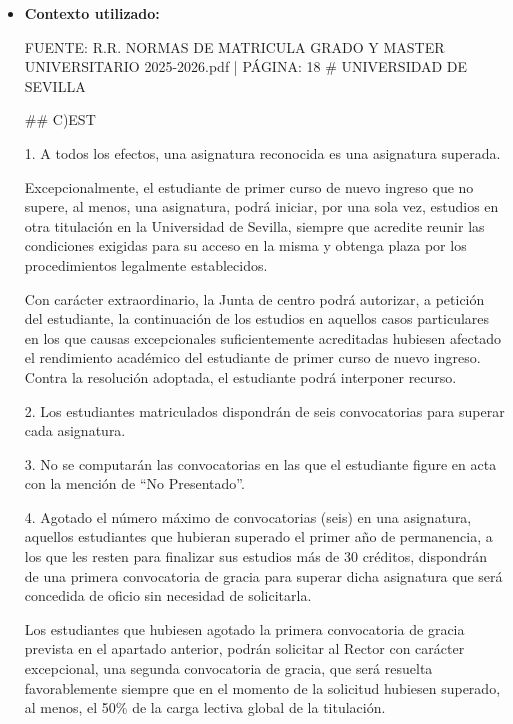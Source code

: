 \documentclass{article}
\begin{document}
\begin{itemize}
\begin{itemize}
                Es importante tener en cuenta que la normativa puede ser objeto de cambios y actualizaciones, por lo que se recomienda consultar la versión más reciente de la normativa y, si es necesario, contactar con la universidad para obtener información más detallada y precisa.
          \item \textbf{Contexto utilizado:}
                \begin{scriptsize}
                  FUENTE: R.R. NORMAS DE MATRICULA GRADO Y MASTER UNIVERSITARIO 2025-2026.pdf | PÁGINA: 18
                  \# UNIVERSIDAD DE SEVILLA

                  \#\# C)EST

                  1. A todos los efectos, una asignatura reconocida es una asignatura superada.

                  Excepcionalmente, el estudiante de primer curso de nuevo ingreso que no supere, al menos, una asignatura, podrá iniciar, por una sola vez, estudios en otra titulación en la Universidad de Sevilla, siempre que acredite reunir las condiciones exigidas para su acceso en la misma y obtenga plaza por los procedimientos legalmente establecidos.

                  Con carácter extraordinario, la Junta de centro podrá autorizar, a petición del estudiante, la continuación de los estudios en aquellos casos particulares en los que causas excepcionales suficientemente acreditadas hubiesen afectado el rendimiento académico del estudiante de primer curso de nuevo ingreso. Contra la resolución adoptada, el estudiante podrá interponer recurso.

                  2. Los estudiantes matriculados dispondrán de seis convocatorias para superar cada asignatura.

                  3. No se computarán las convocatorias en las que el estudiante figure en acta con la mención de “No Presentado”.

                  4. Agotado el número máximo de convocatorias (seis) en una asignatura, aquellos estudiantes que hubieran superado el primer año de permanencia, a los que les resten para finalizar sus estudios más de 30 créditos, dispondrán de una primera convocatoria de gracia para superar dicha asignatura que será concedida de oficio sin necesidad de solicitarla.

                  Los estudiantes que hubiesen agotado la primera convocatoria de gracia prevista en el apartado anterior, podrán solicitar al Rector con carácter excepcional, una segunda convocatoria de gracia, que será resuelta favorablemente siempre que en el momento de la solicitud hubiesen superado, al menos, el 50\% de la carga lectiva global de la titulación.


\end{scriptsize}
\end{itemize}
\end{itemize}
\end{document}
